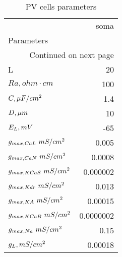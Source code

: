 \begin{longtable}{lr}
\caption{PV cells parameters}\label{ca1_pvbas_cell_parameters}\\
\toprule
{} &      soma \\
Parameters       &           \\
\midrule
\endhead
\midrule
\multicolumn{2}{r}{{Continued on next page}} \\
\midrule
\endfoot

\bottomrule
\endlastfoot
L                &        20 \\
$Ra,
 ohm \cdot cm$               &       100 \\
$C, \linebreak \mu F / cm^2$               &       1.4 \\
$D,\linebreak \mu m$             &        10 \\
$E_L, \linebreak mV$        &       -65 \\
$g_{max, CaL     }\linebreak \  mS / cm^2$&     0.005 \\
$g_{max, CaN     }\linebreak \  mS / cm^2$&    0.0008 \\
$g_{max, KCaS     }\linebreak \  mS / cm^2$&  0.000002 \\
$g_{max, Kdr  }\linebreak \  mS / cm^2$&     0.013 \\
$g_{max, KA      }\linebreak \  mS / cm^2$&   0.00015 \\
$g_{max, KCaB    }\linebreak \  mS / cm^2$& 0.0000002 \\
$g_{max, Na }\linebreak \  mS / cm^2$&      0.15 \\
$g_L, \linebreak mS / cm^2$     &   0.00018 \\
\end{longtable}
